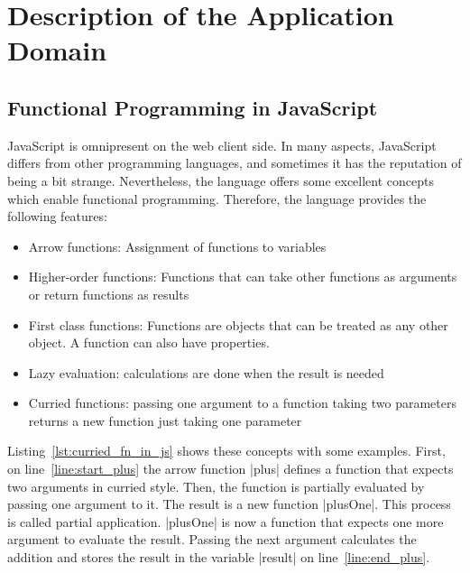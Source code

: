 \section{Description of the Application Domain}
\label{sec:Description of the Application Domain}
\subsection{Functional Programming in JavaScript}
\label{sub:Functional Programming in JavaScript}
JavaScript is omnipresent on the web client side. In many aspects, JavaScript
differs from other programming languages, and sometimes it has the reputation of
being a bit strange. Nevertheless, the language offers some excellent concepts
which enable functional programming. 
Therefore, the language provides the following features: 

\begin{itemize}
  \item{Arrow functions: Assignment of functions to variables} 
  \item{Higher-order functions: Functions that can take other functions as arguments or return functions as results}
  \item{First class functions: Functions are objects that can be treated as any
    other object. A function can also have
  properties.~\cite{mdn_functions_2023}}
  \item{Lazy evaluation: calculations are done when the result is needed}
  \item{Curried functions: passing one argument to a function taking two parameters returns a new function just taking one parameter}
\end{itemize}

Listing~\ref{lst:curried_fn_in_js} shows these concepts with some examples.
First, on line~\ref{line:start_plus} the arrow function |plus| defines a function that expects two arguments in curried style.
Then, the function is partially evaluated by passing one argument to it. 
The result is a new function |plusOne|. This process is called partial application.
|plusOne| is now a function that expects one more argument
to evaluate the result. Passing the next argument calculates the addition and
stores the result in the variable |result| on line~\ref{line:end_plus}.
\\



